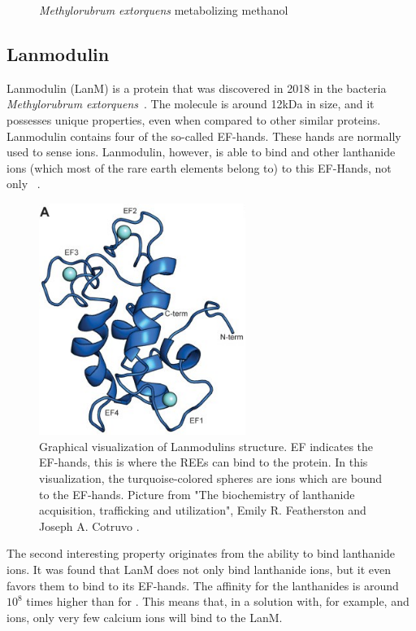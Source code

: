\begin{enumerate}
\begin{figure}[H]
        \caption{\emph{Methylorubrum extorquens} metabolizing methanol}
        \label{fig:mextorquens_metabolizing_methanol}
    \end{figure}
\end{enumerate}


\subsection{Lanmodulin\authorA}
Lanmodulin (LanM) is a protein that was discovered in 2018 in the bacteria \emph{Methylorubrum extorquens}~\cite{lanmdiscovery}.
The molecule is around 12kDa in size, and it possesses unique properties, even when compared to other similar proteins.
Lanmodulin contains four of the so-called EF-hands.
These hands are normally used to sense  ions.
Lanmodulin, however, is able to bind  and other lanthanide ions (which most of the rare earth elements belong to) to this EF-Hands, not only ~\cite{lanmstructure}.

\begin{figure}[H]
    \centering
    \includegraphics[width=0.6\textwidth]{./media/images/lanm_structure}
    \caption{Graphical visualization of Lanmodulins structure. EF indicates the EF-hands, this is where the REEs can bind to the protein. In this visualization, the turquoise-colored spheres are  ions which are bound to the EF-hands. Picture from "The biochemistry of lanthanide acquisition, trafficking and utilization", Emily R. Featherston and Joseph A. Cotruvo \cite{lanmroleinbiology}.}
    \label{fig:lanm_structure2}
\end{figure}

The second interesting property originates from the ability to bind lanthanide ions.
It was found that LanM does not only bind lanthanide ions, but it even favors them to bind to its EF-hands.
The affinity for the lanthanides is around \(10^{8}\) times higher than for .
This means that, in a solution with, for example,  and  ions, only very few calcium ions will bind to the LanM.

